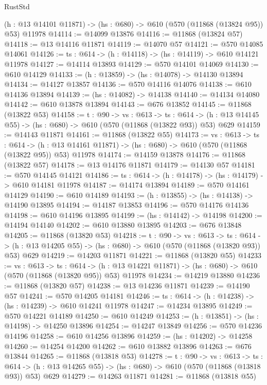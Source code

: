 \begin{lexlean}{RustStd}
\begin{coremodule}
  (h : @13 @14101 @11871) -> (hs : @680) -> @610 (@570 (@11868 (@13824 @95)) @53) @11978
@14114 := @14099 @13876
@14116 := @11868 (@13824 @57)
@14118 := @13 @14116 @11871
@14119 := @14070 @57
@14121 := @570 @14085 @14061
@14126 := {ts : @614} -> (h : @14118) -> (hs : @14119) -> @610 @14121 @11978
@14127 := @14114 @13893
@14129 := @570 @14101 @14069
@14130 := @610 @14129
@14133 := (h : @13859) -> (hs : @14078) -> @14130 @13894
@14134 := @14127 @13857
@14136 := @570 @14116 @14076
@14138 := @610 @14136 @13894
@14139 := (hs : @14082) -> @14138
@14140 := @14134 @14080
@14142 := @610 @13878 @13894
@14143 := @676 @13852
@14145 := @11868 (@13822 @53)
@14158 := {t : @90} ->
  {vs : @613} ->
  {ts : @614} -> (h : @13 @14145 @55) -> (hs : @680) -> @610 (@570 (@11868 (@13822 @93)) @53) @629
@14159 := @14143 @11871
@14161 := @11868 (@13822 @55)
@14173 := {vs : @613} ->
  {ts : @614} ->
  (h : @13 @14161 @11871) -> (hs : @680) -> @610 (@570 (@11868 (@13822 @95)) @53) @11978
@14174 := @14159 @13878
@14176 := @11868 (@13822 @57)
@14178 := @13 @14176 @11871
@14179 := @14130 @57
@14181 := @570 @14145 @14121
@14186 := {ts : @614} -> (h : @14178) -> (hs : @14179) -> @610 @14181 @11978
@14187 := @14174 @13894
@14189 := @570 @14161 @14129
@14190 := @610 @14189
@14193 := (h : @13855) -> (hs : @14138) -> @14190 @13895
@14194 := @14187 @13853
@14196 := @570 @14176 @14136
@14198 := @610 @14196 @13895
@14199 := (hs : @14142) -> @14198
@14200 := @14194 @14140
@14202 := @610 @13880 @13895
@14203 := @676 @13848
@14205 := @11868 (@13820 @53)
@14218 := {t : @90} ->
  {vs : @613} ->
  {ts : @614} -> (h : @13 @14205 @55) -> (hs : @680) -> @610 (@570 (@11868 (@13820 @93)) @53) @629
@14219 := @14203 @11871
@14221 := @11868 (@13820 @55)
@14233 := {vs : @613} ->
  {ts : @614} ->
  (h : @13 @14221 @11871) -> (hs : @680) -> @610 (@570 (@11868 (@13820 @95)) @53) @11978
@14234 := @14219 @13880
@14236 := @11868 (@13820 @57)
@14238 := @13 @14236 @11871
@14239 := @14190 @57
@14241 := @570 @14205 @14181
@14246 := {ts : @614} -> (h : @14238) -> (hs : @14239) -> @610 @14241 @11978
@14247 := @14234 @13895
@14249 := @570 @14221 @14189
@14250 := @610 @14249
@14253 := (h : @13851) -> (hs : @14198) -> @14250 @13896
@14254 := @14247 @13849
@14256 := @570 @14236 @14196
@14258 := @610 @14256 @13896
@14259 := (hs : @14202) -> @14258
@14260 := @14254 @14200
@14262 := @610 @13882 @13896
@14263 := @676 @13844
@14265 := @11868 (@13818 @53)
@14278 := {t : @90} ->
  {vs : @613} ->
  {ts : @614} -> (h : @13 @14265 @55) -> (hs : @680) -> @610 (@570 (@11868 (@13818 @93)) @53) @629
@14279 := @14263 @11871
@14281 := @11868 (@13818 @55)

\end{coremodule}
\end{lexlean}
